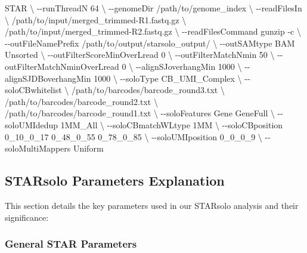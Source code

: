 \documentclass[
  11pt,
  a4paper,
]{report}
\newenvironment{Shaded}{\begin{snugshade}}{\end{snugshade}}
\newcommand{\AttributeTok}[1]{\textcolor[rgb]{0.40,0.45,0.13}{#1}}
\newcommand{\DataTypeTok}[1]{\textcolor[rgb]{0.68,0.00,0.00}{#1}}
\newcommand{\ExtensionTok}[1]{\textcolor[rgb]{0.00,0.23,0.31}{#1}}
\newcommand{\NormalTok}[1]{\textcolor[rgb]{0.00,0.23,0.31}{#1}}
\begin{document}
\begin{Shaded}
\begin{Highlighting}[]
\ExtensionTok{STAR} \DataTypeTok{\textbackslash{}}
\NormalTok{{-}{-}runThreadN 64 }\DataTypeTok{\textbackslash{}}
\NormalTok{{-}{-}genomeDir /path/to/genome\_index }\DataTypeTok{\textbackslash{}}
\NormalTok{{-}{-}readFilesIn }\DataTypeTok{\textbackslash{}}
\NormalTok{/path/to/input/merged\_trimmed{-}R1.fastq.gz }\DataTypeTok{\textbackslash{}}
\NormalTok{/path/to/input/merged\_trimmed{-}R2.fastq.gz }\DataTypeTok{\textbackslash{}}
\NormalTok{{-}{-}readFilesCommand gunzip }\AttributeTok{{-}c} \DataTypeTok{\textbackslash{}}
\NormalTok{{-}{-}outFileNamePrefix /path/to/output/starsolo\_output/ }\DataTypeTok{\textbackslash{}}
\NormalTok{{-}{-}outSAMtype BAM Unsorted }\DataTypeTok{\textbackslash{}}
\NormalTok{{-}{-}outFilterScoreMinOverLread 0 }\DataTypeTok{\textbackslash{}}
\NormalTok{{-}{-}outFilterMatchNmin 50 }\DataTypeTok{\textbackslash{}}
\NormalTok{{-}{-}outFilterMatchNminOverLread 0 }\DataTypeTok{\textbackslash{}}
\NormalTok{{-}{-}alignSJoverhangMin 1000 }\DataTypeTok{\textbackslash{}}
\NormalTok{{-}{-}alignSJDBoverhangMin 1000 }\DataTypeTok{\textbackslash{}}
\NormalTok{{-}{-}soloType CB\_UMI\_Complex }\DataTypeTok{\textbackslash{}}
\NormalTok{{-}{-}soloCBwhitelist }\DataTypeTok{\textbackslash{}}
\NormalTok{/path/to/barcodes/barcode\_round3.txt }\DataTypeTok{\textbackslash{}}
\NormalTok{/path/to/barcodes/barcode\_round2.txt }\DataTypeTok{\textbackslash{}}
\NormalTok{/path/to/barcodes/barcode\_round1.txt }\DataTypeTok{\textbackslash{}}
\NormalTok{{-}{-}soloFeatures Gene GeneFull }\DataTypeTok{\textbackslash{}}
\NormalTok{{-}{-}soloUMIdedup 1MM\_All }\DataTypeTok{\textbackslash{}}
\NormalTok{{-}{-}soloCBmatchWLtype 1MM }\DataTypeTok{\textbackslash{}}
\NormalTok{{-}{-}soloCBposition 0\_10\_0\_17 0\_48\_0\_55 0\_78\_0\_85 }\DataTypeTok{\textbackslash{}}
\NormalTok{{-}{-}soloUMIposition 0\_0\_0\_9 }\DataTypeTok{\textbackslash{}}
\NormalTok{{-}{-}soloMultiMappers Uniform}
\end{Highlighting}
\end{Shaded}

\subsection{STARsolo Parameters
Explanation}\label{starsolo-parameters-explanation}

This section details the key parameters used in our STARsolo analysis
and their significance:

\subsubsection{General STAR Parameters}\label{general-star-parameters}
\end{document}
